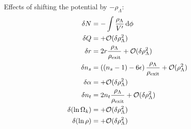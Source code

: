 Effects of shifting the potential by $-\rho_\Lambda$:
\begin{align*}
\delta N &= -\int \frac{\rho_\Lambda}{V'} \,\mathrm d \phi \\
\delta Q &= + \mathcal O(\delta \rho_\Lambda^2) \\
\delta r &= 2 r \frac{\rho_\Lambda}{\rho_{\text{exit}}} + \mathcal O(\delta \rho_\Lambda^2) \\
\delta n_s &= \left((n_s - 1) - 6 \epsilon \right) \frac{\rho_\Lambda}{\rho_{\text{exit}}} + \mathcal O(\rho_\Lambda^2) \\
\delta \alpha &= + \mathcal O(\delta \rho_\Lambda^2) \\
\delta n_t &= 2 n_t \frac{\rho_\Lambda}{\rho_{\text{exit}}} + \mathcal O(\delta \rho_\Lambda^2) \\
\delta(\ln \Omega_k) &= + \mathcal O(\delta \rho_\Lambda^2) \\
\delta(\ln \rho) &= + \mathcal O(\delta \rho_\Lambda^2) 
\end{align*}







